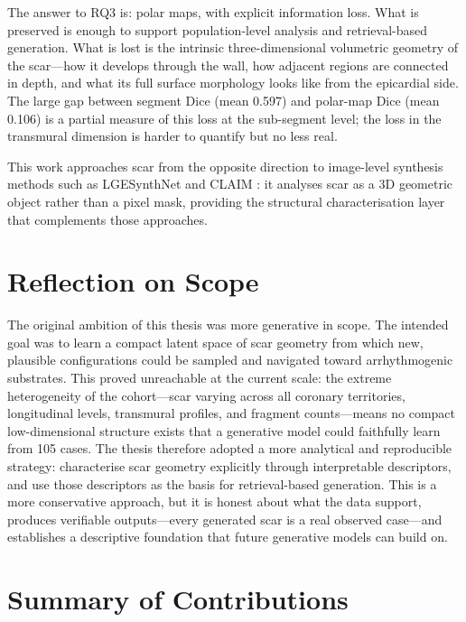 The answer to RQ3 is: polar maps, with explicit information loss. What is preserved is
enough to support population-level analysis and retrieval-based generation. What is lost is
the intrinsic three-dimensional volumetric geometry of the scar---how it develops through the
wall, how adjacent regions are connected in depth, and what its full surface morphology
looks like from the epicardial side. The large gap between segment Dice (mean 0.597) and
polar-map Dice (mean 0.106) is a partial measure of this loss at the sub-segment level; the
loss in the transmural dimension is harder to quantify but no less real.

This work approaches scar from the opposite direction to image-level synthesis methods
such as LGESynthNet \cite{jacob2024} and CLAIM \cite{ramzan2025}: it analyses scar as
a 3D geometric object rather than a pixel mask, providing the structural characterisation
layer that complements those approaches.

\section*{Reflection on Scope}

The original ambition of this thesis was more generative in scope. The intended goal was to
learn a compact latent space of scar geometry from which new, plausible configurations could
be sampled and navigated toward arrhythmogenic substrates. This proved unreachable at the
current scale: the extreme heterogeneity of the cohort---scar varying across all coronary
territories, longitudinal levels, transmural profiles, and fragment counts---means no compact
low-dimensional structure exists that a generative model could faithfully learn from 105 cases.
The thesis therefore adopted a more analytical and reproducible strategy: characterise scar
geometry explicitly through interpretable descriptors, and use those descriptors as the basis
for retrieval-based generation. This is a more conservative approach, but it is honest about
what the data support, produces verifiable outputs---every generated scar is a real observed
case---and establishes a descriptive foundation that future generative models can build on.

\section*{Summary of Contributions}

